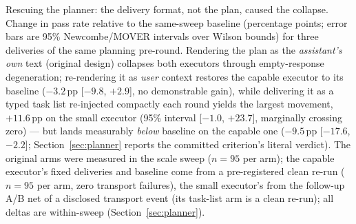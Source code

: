 \caption{Rescuing the planner: the delivery format, not the plan,
caused the collapse. Change in pass rate relative to the same-sweep
baseline (percentage points; error bars are 95\% Newcombe/MOVER
intervals over Wilson bounds) for three deliveries of the same
planning pre-round. Rendering the plan as the \emph{assistant's own}
text (original design) collapses both executors through empty-response
degeneration; re-rendering it as \emph{user} context restores the
capable executor to its baseline ($-3.2$\,pp [$-9.8$, $+2.9$], no
demonstrable gain), while delivering it as a typed task list
re-injected compactly each round yields the largest movement,
$+11.6$\,pp on the small executor (95\% interval [$-1.0$, $+23.7$],
marginally crossing zero) --- but lands measurably \emph{below}
baseline on the capable one ($-9.5$\,pp [$-17.6$, $-2.2$];
Section~\ref{sec:planner} reports the committed criterion's literal
verdict). The original arms were measured in
the scale sweep ($n{=}95$ per arm); the capable executor's fixed
deliveries and baseline come from a pre-registered clean re-run
($n{=}95$ per arm, zero transport failures), the small executor's from
the follow-up A/B net of a disclosed transport event (its task-list
arm is a clean re-run); all deltas are within-sweep
(Section~\ref{sec:planner}).}
